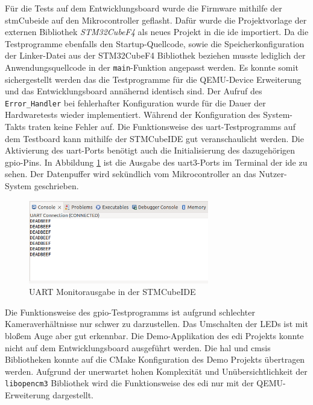 Für die Tests auf dem Entwicklungsboard wurde die Firmware mithilfe der
\ac{stm}Cube\ac{ide} auf den Mikrocontroller geflasht.
Dafür wurde die Projektvorlage der externen Bibliothek \textit{STM32CubeF4} als
neues Projekt in die \ac{ide} importiert.
Da die Testprogramme ebenfalls den Startup-Quellcode, sowie die
Speicherkonfiguration der Linker-Datei aus der STM32CubeF4 Bibliothek beziehen
musste lediglich der Anwendungsquellcode in der \texttt{main}-Funktion
angepasst werden.
Es konnte somit sichergestellt werden das die Testprogramme für die QEMU-Device
Erweiterung und das Entwicklungsboard annähernd identisch sind.
Der Aufruf des \texttt{Error\_Handler} bei fehlerhafter Konfiguration wurde für
die Dauer der Hardwaretests wieder implementiert.
Während der Konfiguration des System-Takts traten keine Fehler auf.
\newline
Die Funktionsweise des \ac{uart}-Testprogramms auf dem Testboard kann mithilfe
der STMCubeIDE gut veranschaulicht werden.
Die Aktivierung des \ac{uart}-Ports benötigt auch die Initialisierung des
dazugehörigen \ac{gpio}-Pins.
In Abbildung \ref{fig:impl-hw-uart-result} ist die Ausgabe des \ac{uart}3-Ports
im Terminal der \ac{ide} zu sehen.
Der Datenpuffer wird sekündlich vom Mikrocontroller an das Nutzer-System
geschrieben.
\newline
\begin{figure}[!htb]
    \centering
    \includegraphics[width=0.7\textwidth]{anlagen/bilder/hw_test_uart}
    \caption{UART Monitorausgabe in der STMCubeIDE}
    \label{fig:impl-hw-uart-result}
\end{figure}

Die Funktionsweise des \ac{gpio}-Testprogramms ist aufgrund schlechter
Kameraverhältnisse nur schwer zu darzustellen.
Das Umschalten der LEDs ist mit bloßem Auge aber gut erkennbar.
\newline
Die Demo-Applikation des \ac{edi} Projekts konnte nicht auf dem
Entwicklungsboard ausgeführt werden.
Die \ac{hal} und \ac{cmsis} Bibliotheken konnte auf die CMake Konfiguration des
Demo Projekts übertragen werden.
Aufgrund der unerwartet hohen Komplexität und Unübersichtlichkeit der
\texttt{libopencm3} Bibliothek wird die Funktionsweise des \acl{edi} nur mit
der QEMU-Erweiterung dargestellt.
